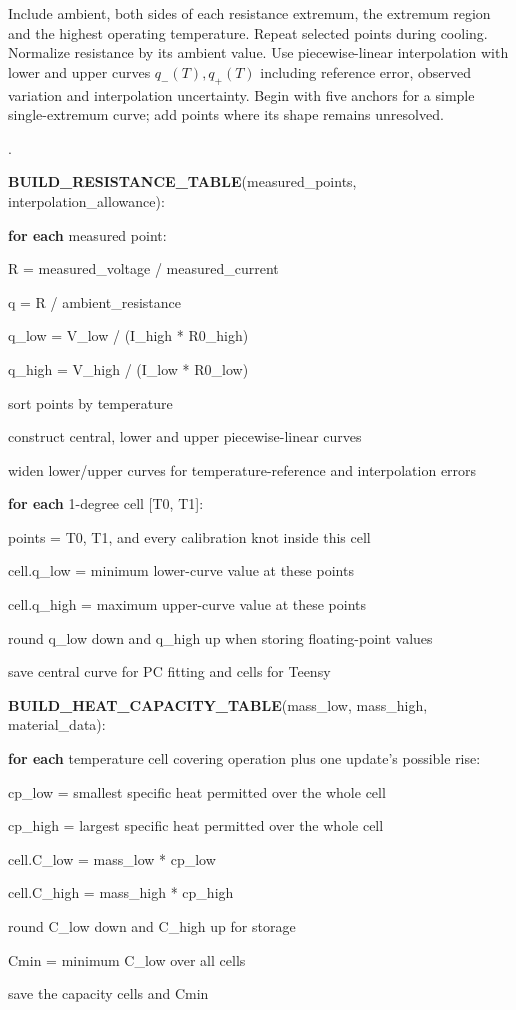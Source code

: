 \documentclass[11pt,letterpaper]{article}
\newcounter{pseudoline}
\newenvironment{pseudocode}{%
  \par\begingroup\small
  \setcounter{pseudoline}{0}
  \begin{list}{\arabic{pseudoline}.}{%
    \usecounter{pseudoline}
    \setlength{\leftmargin}{2.5em}
    \setlength{\labelwidth}{1.9em}
    \setlength{\labelsep}{0.6em}
    \setlength{\itemsep}{0.15em}
    \setlength{\parsep}{0pt}
    \setlength{\topsep}{0.35em}}%
  }{\end{list}\endgroup\par}
\newcommand{\pcstep}[2]{%
  \item \hspace*{#1em}%
  \parbox[t]{\dimexpr\linewidth-#1em\relax}{\raggedright #2\strut}}
\begin{document}
Include ambient, both sides of each resistance extremum, the extremum region and the highest operating temperature. Repeat selected points during cooling. Normalize resistance by its ambient value. Use piecewise-linear interpolation with lower and upper curves \(q_-(T),q_+(T)\) including reference error, observed variation and interpolation uncertainty. Begin with five anchors for a simple single-extremum curve; add points where its shape remains unresolved.

\begin{pseudocode}
\pcstep{0.0}{\textbf{BUILD\_\allowbreak{}RESISTANCE\_\allowbreak{}TABLE}(measured\_\allowbreak{}points, interpolation\_\allowbreak{}allowance):}
\pcstep{1.0}{\textbf{for each} measured point:}
\pcstep{2.0}{R = measured\_\allowbreak{}voltage / measured\_\allowbreak{}current}
\pcstep{2.0}{q = R / ambient\_\allowbreak{}resistance}
\pcstep{2.0}{q\_\allowbreak{}low = V\_\allowbreak{}low / (I\_\allowbreak{}high * R0\_\allowbreak{}high)}
\pcstep{2.0}{q\_\allowbreak{}high = V\_\allowbreak{}high / (I\_\allowbreak{}low * R0\_\allowbreak{}low)}
\pcstep{1.0}{sort points by temperature}
\pcstep{1.0}{construct central, lower and upper piecewise-linear curves}
\pcstep{1.0}{widen lower/upper curves for temperature-reference and interpolation errors}
\par\vspace{0.35em}
\pcstep{1.0}{\textbf{for each} 1-degree cell [T0, T1]:}
\pcstep{2.0}{points = T0, T1, and every calibration knot inside this cell}
\pcstep{2.0}{cell.q\_\allowbreak{}low = minimum lower-curve value at these points}
\pcstep{2.0}{cell.q\_\allowbreak{}high = maximum upper-curve value at these points}
\pcstep{2.0}{round q\_\allowbreak{}low down and q\_\allowbreak{}high up when storing floating-point values}
\pcstep{1.0}{save central curve for PC fitting and cells for Teensy}
\par\vspace{0.35em}
\pcstep{0.0}{\textbf{BUILD\_\allowbreak{}HEAT\_\allowbreak{}CAPACITY\_\allowbreak{}TABLE}(mass\_\allowbreak{}low, mass\_\allowbreak{}high, material\_\allowbreak{}data):}
\pcstep{1.0}{\textbf{for each} temperature cell covering operation plus one update's possible rise:}
\pcstep{2.0}{cp\_\allowbreak{}low = smallest specific heat permitted over the whole cell}
\pcstep{2.0}{cp\_\allowbreak{}high = largest specific heat permitted over the whole cell}
\pcstep{2.0}{cell.C\_\allowbreak{}low = mass\_\allowbreak{}low * cp\_\allowbreak{}low}
\pcstep{2.0}{cell.C\_\allowbreak{}high = mass\_\allowbreak{}high * cp\_\allowbreak{}high}
\pcstep{2.0}{round C\_\allowbreak{}low down and C\_\allowbreak{}high up for storage}
\pcstep{1.0}{Cmin = minimum C\_\allowbreak{}low over all cells}
\pcstep{1.0}{save the capacity cells and Cmin}
\end{pseudocode}
\end{document}
